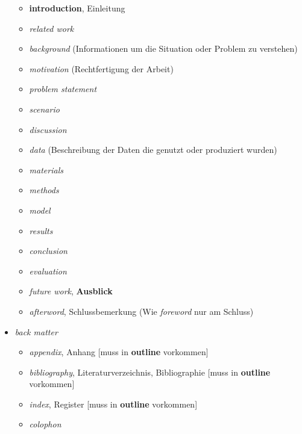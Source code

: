 \begin{itemize}
    \begin{itemize}
    \itemsep1pt\parskip0pt
    \item
      \textbf{introduction}, Einleitung
    \item
      \emph{related work}
    \item
      \emph{background} (Informationen um die Situation oder Problem zu
      verstehen)
    \item
      \emph{motivation} (Rechtfertigung der Arbeit)
    \item
      \emph{problem statement}
    \item
      \emph{scenario}
    \item
      \emph{discussion}
    \item
      \emph{data} (Beschreibung der Daten die genutzt oder produziert
      wurden)
    \item
      \emph{materials}
    \item
      \emph{methods}
    \item
      \emph{model}
    \item
      \emph{results}
    \item
      \emph{conclusion}
    \item
      \emph{evaluation}
    \item
      \emph{future work}, \textbf{Ausblick}
    \item
      \emph{afterword}, Schlussbemerkung (Wie \emph{foreword} nur am
      Schluss)
    \end{itemize}
  \item
    \emph{back matter}

    \begin{itemize}
    \itemsep1pt\parskip0pt
    \item
      \emph{appendix}, Anhang {[}muss in \textbf{outline} vorkommen{]}
    \item
      \emph{bibliography}, Literaturverzeichnis, Bibliographie {[}muss
      in \textbf{outline} vorkommen{]}
    \item
      \emph{index}, Register {[}muss in \textbf{outline} vorkommen{]}
    \item
      \emph{colophon}
    \end{itemize}
  \end{itemize}